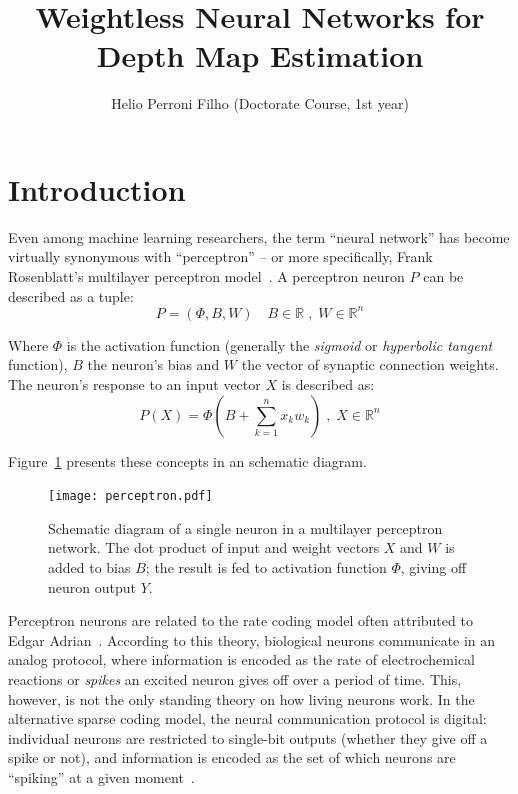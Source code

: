 \documentclass[twocolumn, 9pt]{jsproceedings}
\title{Weightless Neural Networks for Depth Map Estimation}
\author{Helio Perroni Filho (Doctorate Course, 1st year)\authorrefmark{1}}
\affiliation{Intelligent Robotics Laboratory, OHYA's group}
\begin{document}
\thispagestyle{myheadings}
\maketitle


\section{Introduction}

Even among machine learning researchers, the term ``neural network'' has become virtually synonymous with ``perceptron'' -- or more specifically, Frank Rosenblatt's multilayer perceptron model~\cite{rosenblatt58}. A perceptron neuron \(P\) can be described as a tuple:
\begin{equation*}
P = (\Phi , B , W) \quad B \in \mathbb{R} \; , \; W \in \mathbb{R}^n
\end{equation*}

Where \(\Phi\) is the activation function (generally the {\it sigmoid} or {\it hyperbolic tangent} function), \(B\) the neuron's bias and \(W\) the vector of synaptic connection weights. The neuron's response to an input vector \(X\) is described as:
\begin{equation*}
P (X) = \Phi(B + \sum_{k = 1}^{n} {x_k w_k}) \; , \; X \in \mathbb{R}^n
\end{equation*}

Figure~\ref{fig:perceptron} presents these concepts in an schematic diagram.

\begin{figure}[h!]
\texttt{[image: perceptron.pdf]}
\caption{Schematic diagram of a single neuron in a multilayer perceptron network. The dot product of input and weight vectors \(X\) and \(W\) is added to bias \(B\); the result is fed to activation function \(\Phi\), giving off neuron output \(Y\).}
\label{fig:perceptron}
\end{figure}

Perceptron neurons are related to the rate coding model often attributed to Edgar Adrian~\cite{adrian26}. According to this theory, biological neurons communicate in an analog protocol, where information is encoded as the rate of electrochemical reactions or {\it spikes} an excited neuron gives off over a period of time. This, however, is not the only standing theory on how living neurons work. In the alternative sparse coding model, the neural communication protocol is digital: individual neurons are restricted to single-bit outputs (whether they give off a spike or not), and information is encoded as the set of which neurons are ``spiking'' at a given moment~\cite{olshausen04}.
\end{document}

